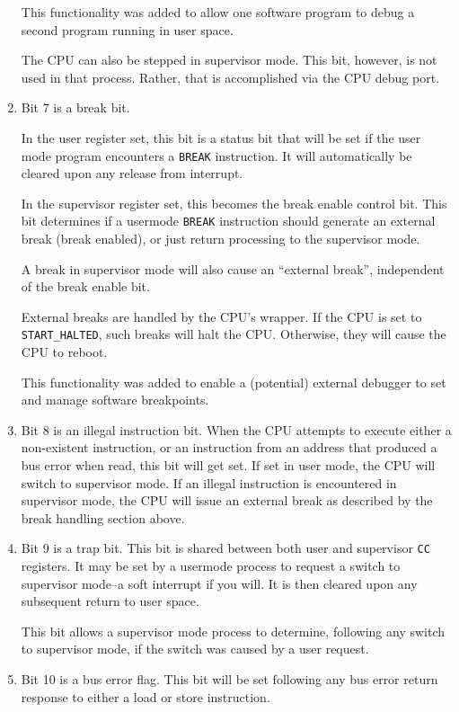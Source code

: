\documentclass{gqtekspec}
\begin{document}
\begin{enumerate}
	This functionality was added to allow one software program to debug
	a second program running in user space.

	The CPU can also be stepped in supervisor mode.  This bit, however, is
	not used in that process.  Rather, that is accomplished via the CPU
	debug port.

\item Bit 7 is a break bit.

	In the user register set, this bit is a status bit that will be set if
	the user mode program encounters a {\tt BREAK} instruction.  It will
	automatically be cleared upon any release from interrupt.

	In the supervisor register set, this becomes the break enable control
	bit.  This bit determines if a usermode {\tt BREAK} instruction should
	generate an external break (break enabled), or just return processing
	to the supervisor mode.

	A break in supervisor mode will also cause an ``external break'',
	independent of the break enable bit.

	External breaks are handled by the CPU's wrapper.  If the CPU is set to
	{\tt START\_HALTED}, such breaks will halt the CPU.  Otherwise, they
	will cause the CPU to reboot.

	This functionality was added to enable a (potential) external debugger
	to set and manage software breakpoints.

\item Bit 8 is an illegal instruction bit.  When the CPU attempts to
	execute either a non-existent instruction, or an instruction from
	an address that produced a bus error when read, this bit will
	get set.  If set in user mode, the CPU will switch to supervisor mode.
	If an illegal instruction is encountered in supervisor mode,
	the CPU will issue an external break as described by the break
	handling section above.

\item Bit 9 is a trap bit.  This bit is shared between both user and supervisor
	{\tt CC} registers.  It may be set by a usermode process to request a
	switch to supervisor mode--a soft interrupt if you will.  It is
	then cleared upon any subsequent return to user space.

	This bit allows a supervisor mode process to determine, following any
	switch to supervisor mode, if the switch was caused by a user request.

\item Bit 10 is a bus error flag.  This bit will be set following any bus
	error return response to either a load or store instruction.


\end{enumerate}
\end{document}
